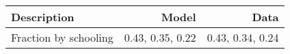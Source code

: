 \begin{tabular}{lrr}
\hline
Description & Model  & Data  \\
\hline
Fraction by schooling & 0.43, 0.35, 0.22  & 0.43, 0.34, 0.24  \\
\hline
\end{tabular}%
